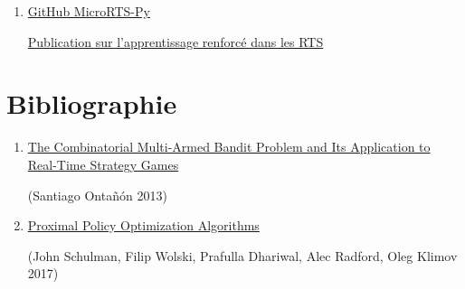 \documentclass[french]{article}
\begin{document}
	\renewcommand{\labelenumi}{\up{\arabic{enumi}}}
	\begin{enumerate}
		\item{
			\href{https://github.com/Farama-Foundation/MicroRTS-Py\#papers-written-using-gym-µrts}{GitHub MicroRTS-Py}
			
			\href{https://wandb.ai/vwxyzjn/gym-microrts-paper/reports/Gym-RTS-Toward-Affordable-Deep-Reinforcement-Learning-Research-in-Real-Time-Strategy-Games--Vmlldzo2MDIzMTg}{Publication sur l'apprentissage renforcé dans les RTS}    
		}
	\end{enumerate}
	
	\section{Bibliographie}
	\begin{enumerate}
		\item{
			\href{https://www.aaai.org/ocs/index.php/AIIDE/AIIDE13/paper/viewPaper/7377}{The Combinatorial Multi-Armed Bandit Problem and Its Application to Real-Time Strategy Games}
			
			(Santiago Ontañón 2013)
		}
		\item{
			\href{https://arxiv.org/abs/1707.06347}{Proximal Policy Optimization Algorithms}
			
			(John Schulman, Filip Wolski, Prafulla Dhariwal, Alec Radford, Oleg Klimov 2017)
		}
	\end{enumerate}
	
	
\end{document}
